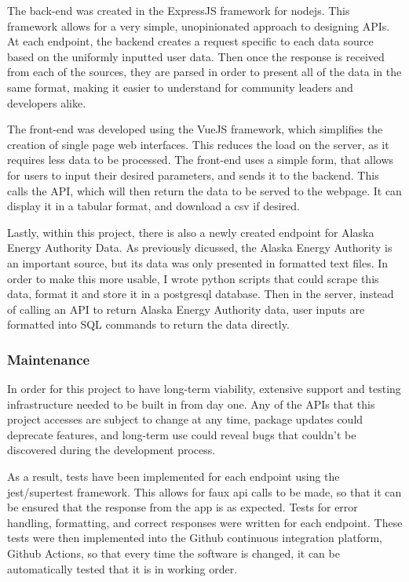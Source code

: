 \documentclass[12pt, oneside]{article}   	%
\begin{document}
The back-end was created in the ExpressJS framework for nodejs. This framework
allows for a very simple, unopinionated approach to designing
APIs.\cite{EXPRESS-HOME} At each endpoint, the backend creates a request
specific to each data source based on the uniformly inputted user data. Then
once the response is received from each of the sources, they are parsed in order
to present all of the data in the same format, making it easier to understand
for community leaders and developers alike.

The front-end was developed using the VueJS framework, which simplifies the
creation of single page web interfaces. This reduces the load on the server, as
it requires less data to be processed. The front-end uses a simple form, that
allows for users to input their desired parameters, and sends it to the backend.
This calls the API, which will then return the data to be served to the webpage.
It can display it in a tabular format, and download a csv if desired.

Lastly, within this project, there is also a newly created endpoint for Alaska
Energy Authority Data. As previously dicussed, the Alaska Energy Authority is an
important source, but its data was only presented in formatted text files. In
order to make this more usable, I wrote python scripts that could scrape this
data, format it and store it in a postgresql database. Then in the server,
instead of calling an API to return Alaska Energy Authority data, user inputs
are formatted into SQL commands to return the data directly.
\subsubsection{Maintenance}
In order for this project to have long-term viability, extensive support and
testing infrastructure needed to be built in from day one. Any of the APIs that
this project accesses are subject to change at any time, package updates could
deprecate features, and long-term use could reveal bugs that couldn't be
discovered during the development process.

As a result, tests have been implemented for each endpoint using the
jest/supertest framework. This allows for faux api calls to be made, so that it
can be ensured that the response from the app is as expected. Tests for error
handling, formatting, and correct responses were written for each endpoint.
These tests were then implemented into the Github continuous integration
platform, Github Actions, so that every time the software is changed, it can be
automatically tested that it is in working order.
\end{document}
